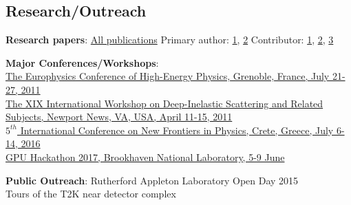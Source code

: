 \documentclass[margin,line]{resume}
\begin{document}
\begin{resume}
    \section{\mysidestyle Research/Outreach}

    \begin{list2}
    \item {\bf Research papers}: \href{http://inspirehep.net/author/profile/T.P.Stewart.1}{All publications} Primary author: \href{http://inspirehep.net/record/1183813}{1}, \href{https://pos.sissa.it/134/367}{2} Contributor: \href{http://inspirehep.net/record/811152}{1}, \href{http://inspirehep.net/record/1269458}{2}, \href{http://inspirehep.net/record/1501882}{3}
    \item {\bf Major Conferences/Workshops}: \\\href{http://hep2011.insight-outside.fr/}{The Europhysics Conference of High-Energy Physics, Grenoble, France, July 21-27, 2011}\\\href{https://www.jlab.org/conferences/dis2011/}{The XIX International Workshop on Deep-Inelastic Scattering and Related Subjects, Newport News, VA, USA, April 11-15, 2011}\\\href{https://indico.cern.ch/event/442094/}{$5^{th}$ International Conference on New Frontiers in Physics, Crete, Greece, July 6-14, 2016}\\\href{https://www.bnl.gov/gpuhackathon/}{GPU Hackathon 2017, Brookhaven National Laboratory, 5-9 June}
    \item {\bf Public Outreach}: Rutherford Appleton Laboratory Open Day 2015\\Tours of the T2K near detector complex
    \end{list2}
\end{resume}
\end{document}

